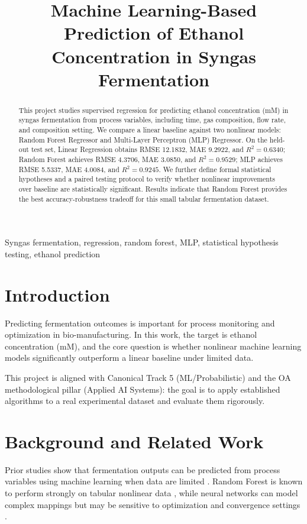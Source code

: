 \documentclass[conference]{IEEEtran}
\title{Machine Learning-Based Prediction of Ethanol Concentration in Syngas Fermentation}
\author{\IEEEauthorblockN{Ying Tan}
\IEEEauthorblockA{CIS 732 / CIS 830, Kansas State University}}
\begin{document}
\maketitle

\begin{abstract}
This project studies supervised regression for predicting ethanol concentration (mM) in syngas fermentation from process variables, including time, gas composition, flow rate, and composition setting. We compare a linear baseline against two nonlinear models: Random Forest Regressor and Multi-Layer Perceptron (MLP) Regressor. On the held-out test set, Linear Regression obtains RMSE 12.1832, MAE 9.2922, and $R^2=0.6340$; Random Forest achieves RMSE 4.3706, MAE 3.0850, and $R^2=0.9529$; MLP achieves RMSE 5.5337, MAE 4.0084, and $R^2=0.9245$. We further define formal statistical hypotheses and a paired testing protocol to verify whether nonlinear improvements over baseline are statistically significant. Results indicate that Random Forest provides the best accuracy-robustness tradeoff for this small tabular fermentation dataset.
\end{abstract}

\begin{IEEEkeywords}
Syngas fermentation, regression, random forest, MLP, statistical hypothesis testing, ethanol prediction
\end{IEEEkeywords}

\section{Introduction}
Predicting fermentation outcomes is important for process monitoring and optimization in bio-manufacturing. In this work, the target is ethanol concentration (mM), and the core question is whether nonlinear machine learning models significantly outperform a linear baseline under limited data.

This project is aligned with Canonical Track 5 (ML/Probabilistic) and the OA methodological pillar (Applied AI Systems): the goal is to apply established algorithms to a real experimental dataset and evaluate them rigorously.

\section{Background and Related Work}
Prior studies show that fermentation outputs can be predicted from process variables using machine learning when data are limited \cite{roell2022,syngasrepo}. Random Forest is known to perform strongly on tabular nonlinear data \cite{breiman2001}, while neural networks can model complex mappings but may be sensitive to optimization and convergence settings \cite{rumelhart1986}.
\end{document}
